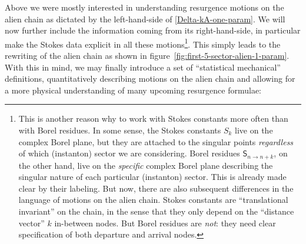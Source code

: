 \documentclass[11pt,a4paper]{article}
\begin{document}
Above we were mostly interested in understanding resurgence motions on the alien chain as dictated by the left-hand-side of \eqref{Delta-kA-one-param}. We will now further include the information coming from its right-hand-side, in particular make the Stokes data explicit in all these motions\footnote{This is another reason why to work with Stokes constants more often than with Borel residues. In some sense, the Stokes constants $S_k$ live on the complex Borel plane, but they are attached to the singular points \textit{regardless} of which (instanton) sector we are considering. Borel residues $\mathsf{S}_{n\to n+k}$, on the other hand, live on the \textit{specific} complex Borel plane describing the singular nature of each particular (instanton) sector. This is already made clear by their labeling. But now, there are also subsequent differences in the language of motions on the alien chain. Stokes constants are ``translational invariant'' on the chain, in the sense that they only depend on the ``distance vector'' $k$ in-between nodes. But Borel residues are \textit{not}: they need clear specification of both departure and arrival nodes.}. This simply leads to the rewriting of the alien chain as shown in figure~\ref{fig:first-5-sector-alien-1-param}. With this in mind, we may finally introduce a set of ``statistical mechanical'' definitions, quantitatively describing motions on the alien chain and allowing for a more physical understanding of many upcoming resurgence formulae:
\end{document}
